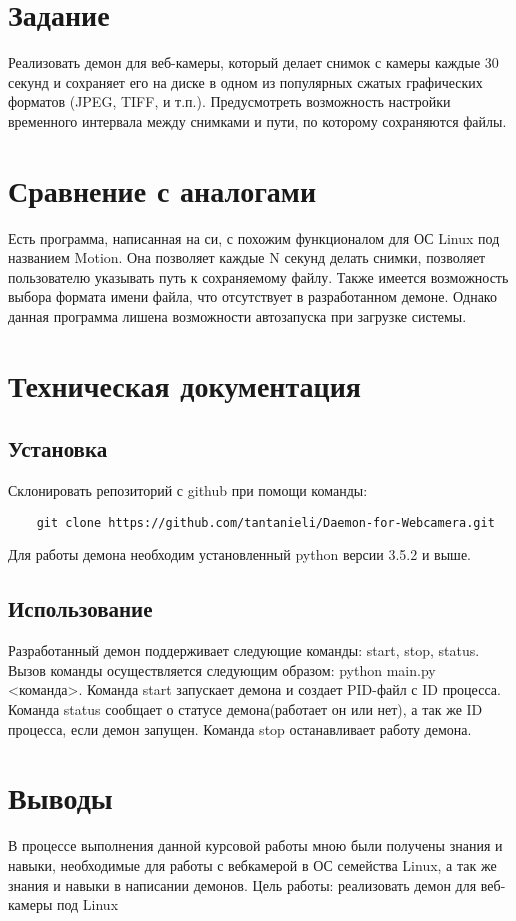 \documentclass[12pt,a4paper]{scrartcl}
\begin{document}
\section{Задание}
	Реализовать демон для веб-камеры, который делает снимок с
	камеры каждые 30 секунд и сохраняет его на диске в одном из популярных сжатых
	графических форматов (JPEG, TIFF, и т.п.). Предусмотреть возможность настройки
	временного интервала между снимками и пути, по которому сохраняются файлы.
\section{Сравнение с аналогами}
	Есть программа, написанная на си, с похожим функционалом для ОС Linux под названием Motion. Она позволяет каждые N секунд делать снимки, позволяет пользователю указывать путь к сохраняемому файлу. Также имеется возможность выбора формата имени файла, что отсутствует в разработанном демоне. Однако данная программа лишена возможности автозапуска при загрузке системы.
\section{Техническая документация}
\subsection{Установка}
	Склонировать репозиторий с github при помощи команды: \begin{verbatim}
	git clone https://github.com/tantanieli/Daemon-for-Webcamera.git
	\end{verbatim}Для работы демона необходим установленный python версии 3.5.2 и выше.
\subsection{Использование}
	Разработанный демон поддерживает следующие команды: start, stop, status. Вызов команды осуществляется следующим образом: python main.py <команда>. Команда start запускает демона и создает PID-файл с ID процесса. Команда status сообщает о статусе демона(работает он или нет), а так же ID процесса, если демон запущен. Команда stop останавливает работу демона. 
\section{Выводы}
	В процессе выполнения данной курсовой работы мною были получены знания и навыки, необходимые для работы с вебкамерой в ОС семейства Linux, а так же знания и навыки в написании демонов.
\normalsize{Цель работы: реализовать демон для веб-камеры под Linux}
\end{document}
